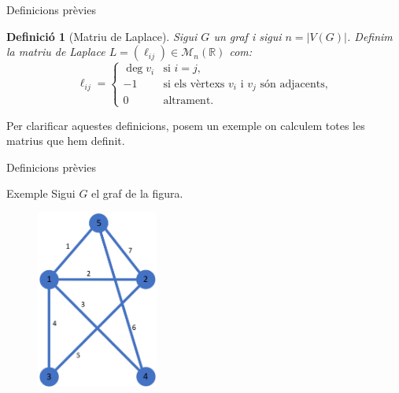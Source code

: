 \documentclass{beamer}
\newtheorem{defin}[theorem]{Definició}
\begin{document}
\begin{frame}{Definicions prèvies}
    \begin{defin}[Matriu de Laplace]
        \normalfont Sigui $G$ un graf i sigui $n=|V(G)|$. Definim la matriu de Laplace $L=(\ell_{ij})\in\mathcal{M}_n(\mathbb{R})$ com:
        $$\ell_{ij}=\left\{\begin{array}{cl}
                \deg v_i & \text{si $i=j$,}                                   \\
                -1       & \text{si els vèrtexs $v_i$ i $v_j$ són adjacents,} \\
                0        & \text{altrament.}
            \end{array}\right.$$
    \end{defin}\pause
    Per clarificar aquestes definicions, posem un exemple on calculem totes les matrius que hem definit.
\end{frame}
\begin{frame}{Definicions prèvies}
    \begin{exampleblock}{Exemple}
        Sigui $G$ el graf de la figura.
        \begin{figure}
            \centering
            \includegraphics[width=4cm]{Imatges/exemple1.jpg}
        \end{figure}
    \end{exampleblock}
\end{frame}
\end{document}
